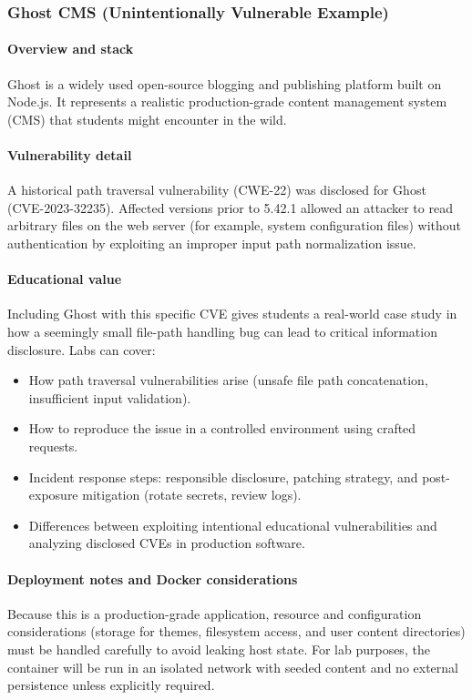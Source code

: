 \documentclass[12pt]{article}
\begin{document}
\subsubsection{Ghost CMS (Unintentionally Vulnerable Example)}
\paragraph{Overview and stack}
Ghost is a widely used open-source blogging and publishing platform built on Node.js. It represents a realistic production-grade content management system (CMS) that students might encounter in the wild.

\paragraph{Vulnerability detail}
A historical path traversal vulnerability (CWE-22) was disclosed for Ghost (CVE-2023-32235). Affected versions prior to 5.42.1 allowed an attacker to read arbitrary files on the web server (for example, system configuration files) without authentication by exploiting an improper input path normalization issue.

\paragraph{Educational value}
Including Ghost with this specific CVE gives students a real-world case study in how a seemingly small file-path handling bug can lead to critical information disclosure. Labs can cover:
\begin{itemize}
    \item How path traversal vulnerabilities arise (unsafe file path concatenation, insufficient input validation).
    \item How to reproduce the issue in a controlled environment using crafted requests.
    \item Incident response steps: responsible disclosure, patching strategy, and post-exposure mitigation (rotate secrets, review logs).
    \item Differences between exploiting intentional educational vulnerabilities and analyzing disclosed CVEs in production software.
\end{itemize}

\paragraph{Deployment notes and Docker considerations}
Because this is a production-grade application, resource and configuration considerations (storage for themes, filesystem access, and user content directories) must be handled carefully to avoid leaking host state. For lab purposes, the container will be run in an isolated network with seeded content and no external persistence unless explicitly required.
\end{document}
